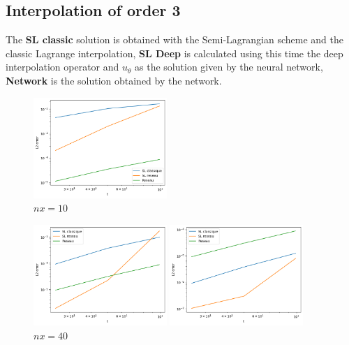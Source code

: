 \documentclass{article}
\begin{document}
\subsection{Interpolation of order 3}

The \textbf{SL classic} solution is obtained with the Semi-Lagrangian scheme and the classic Lagrange interpolation, \textbf{SL Deep} is calculated using this time the deep interpolation operator and $u_\theta $ as the solution given by the neural network, \textbf{Network} is the solution obtained by the network.\\

\begin{figure}[!h]
    \centering
    \includegraphics[width=0.45\textwidth]{images/i310.png}
    \caption{$nx = 10$}
\end{figure}
\newpage 

\begin{figure}[!h]
    \includegraphics[width=0.45\textwidth]{images/i320.png}
    \caption{$nx = 20$}

    \includegraphics[width=0.45\textwidth]{images/i3.png}
    \caption{$nx = 40$}
\end{figure}
\end{document}
